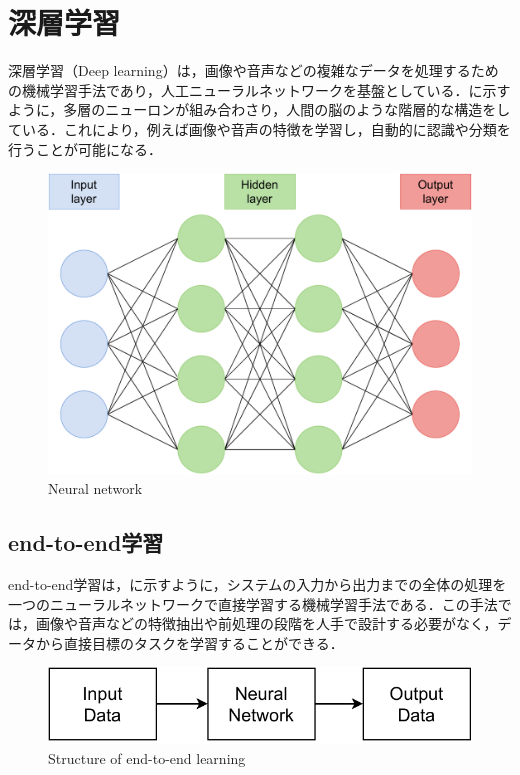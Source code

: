 
\section{深層学習}

  深層学習（Deep learning）は，画像や音声などの複雑なデータを処理するための機械学習手法であり，人工ニューラルネットワークを基盤としている．に示すように，多層のニューロンが組み合わさり，人間の脳のような階層的な構造をしている．これにより，例えば画像や音声の特徴を学習し，自動的に認識や分類を行うことが可能になる．

  \begin{figure}[h]
    \centering
    \includegraphics[keepaspectratio, scale=0.45] {images/pdf/deep_neural_network}
    \caption{Neural network}
    \label{Fig:deep_neural_network}
  \end{figure}

\newpage

\subsection{end-to-end学習}

  end-to-end学習は，に示すように，システムの入力から出力までの全体の処理を一つのニューラルネットワークで直接学習する機械学習手法である．この手法では，画像や音声などの特徴抽出や前処理の段階を人手で設計する必要がなく，データから直接目標のタスクを学習することができる．

  \vspace{2cm}

  \begin{figure}[h]
    \centering
    \includegraphics[keepaspectratio, scale=0.90] {images/pdf/RobotGuidance_about_end-to-end}
    \caption{Structure of end-to-end learning}
    \label{Fig:about_end-to-end}
  \end{figure}

